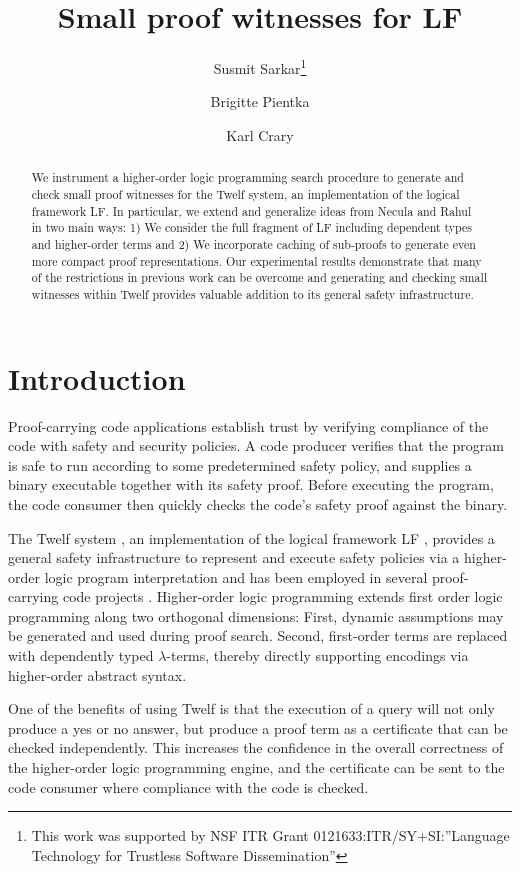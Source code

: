\documentclass{llncs}
\title{Small proof witnesses for LF}
\author{
Susmit Sarkar\inst{1}\thanks{This work was supported by NSF ITR Grant 0121633:ITR/SY+SI:''Language Technology for Trustless Software Dissemination''}
\and Brigitte Pientka\inst{2}
\and Karl Crary\inst{1}}%
\institute{%
Carnegie Mellon University, Pittsburgh, USA
\and McGill University, Montr\'eal, Canada
}
\date{}
\begin{document}
\maketitle 
\begin{abstract}
We instrument a higher-order logic programming search procedure to
generate and check small proof witnesses for the Twelf system, an
implementation of the logical framework LF. In particular, we extend
and generalize ideas from Necula and Rahul~\cite{Necula+01:oracle} in
two main ways: 1) We consider the full fragment of LF including
dependent types and higher-order terms and 2) We incorporate caching
of sub-proofs to generate even more compact proof representations. Our
experimental results demonstrate that many of the restrictions in
previous work can be overcome and generating and checking small
witnesses within Twelf provides valuable addition to its general
safety infrastructure.
\end{abstract}

\section{Introduction}
Proof-carrying code applications establish trust by verifying
compliance of the code with safety and security policies.
A code producer verifies that the program is safe to
run according to some predetermined safety policy, and supplies a
binary executable together with its safety proof. Before
executing the program, the code consumer then quickly checks the code's
safety proof against the binary. 

The Twelf system \cite{Pfenning99cade}, an implementation of the
logical framework LF \cite{Harper93jacm}, provides a general safety
infrastructure to represent and execute safety policies via a
higher-order logic program interpretation and has been employed in
several proof-carrying code projects
\cite{AppelFelty00,Crary:POPL03,AppelFelten99,Crary:CADE03}.
Higher-order logic programming extends first order logic programming
along two orthogonal dimensions: First, dynamic assumptions may be
generated and used during proof search. Second, first-order terms are
replaced with dependently typed $\lambda$-terms, thereby directly
supporting encodings via higher-order abstract syntax.

One of the benefits of using Twelf is that the execution of a query
will not only produce a yes or no answer, but produce a proof term as
a certificate that can be checked independently.  This increases the
confidence in the overall correctness of the higher-order logic
programming engine, and the certificate can be sent to the code
consumer where compliance with the code is checked.
\end{document}
